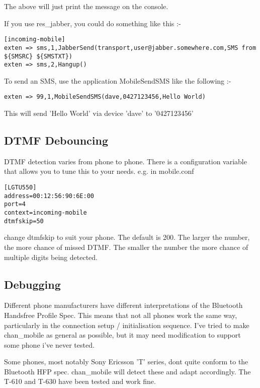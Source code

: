The above will just print the message on the console.

If you use res\_jabber, you could do something like this :-

\begin{astlisting}
\begin{verbatim}
[incoming-mobile]
exten => sms,1,JabberSend(transport,user@jabber.somewhere.com,SMS from ${SMSRC} ${SMSTXT})
exten => sms,2,Hangup()
\end{verbatim}
\end{astlisting}

To send an SMS, use the application MobileSendSMS like the following :-

\begin{verbatim}
exten => 99,1,MobileSendSMS(dave,0427123456,Hello World)
\end{verbatim}

This will send 'Hello World' via device 'dave' to '0427123456'


\subsection{DTMF Debouncing}

DTMF detection varies from phone to phone. There is a configuration variable that allows you to tune
this to your needs. e.g. in mobile.conf

\begin{verbatim}
[LGTU550]
address=00:12:56:90:6E:00
port=4
context=incoming-mobile
dtmfskip=50
\end{verbatim}

change dtmfskip to suit your phone. The default is 200. The larger the number, the more chance of missed DTMF.
The smaller the number the more chance of multiple digits being detected.


\subsection{Debugging}

Different phone manufacturers have different interpretations of the Bluetooth Handsfree Profile Spec.
This means that not all phones work the same way, particularly in the connection setup / initialisation
sequence. I've tried to make chan\_mobile as general as possible, but it may need modification to
support some phone i've never tested.

Some phones, most notably Sony Ericsson 'T' series, dont quite conform to the Bluetooth HFP spec.
chan\_mobile will detect these and adapt accordingly. The T-610 and T-630 have been tested and
work fine.

